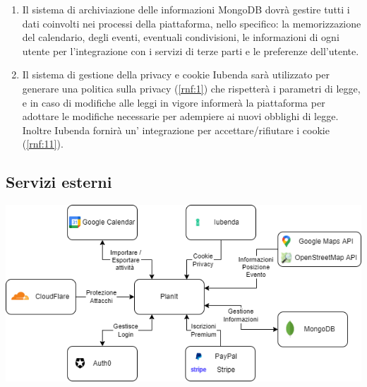 \begin{enumerate}
    \item Il sistema di archiviazione delle informazioni MongoDB dovrà gestire tutti i dati coinvolti nei processi della piattaforma, nello specifico: la memorizzazione del calendario, degli eventi, eventuali condivisioni, le informazioni di ogni utente per l'integrazione con i servizi di terze parti e le preferenze dell'utente.

    \item Il sistema di gestione della privacy e cookie Iubenda sarà utilizzato per generare una politica sulla privacy (\ref{rnf:1}) che rispetterà i parametri di legge, e in caso di modifiche alle leggi in vigore informerà la piattaforma per adottare le modifiche necessarie per adempiere ai nuovi obblighi di legge. Inoltre Iubenda fornirà un' integrazione per accettare/rifiutare i cookie (\ref{rnf:11}).

\end{enumerate}

\subsection*{Servizi esterni}
\begin{center}
    \includegraphics[width=1\textwidth]{img/Servizi/Servizi esterni.drawio.png}
\end{center}